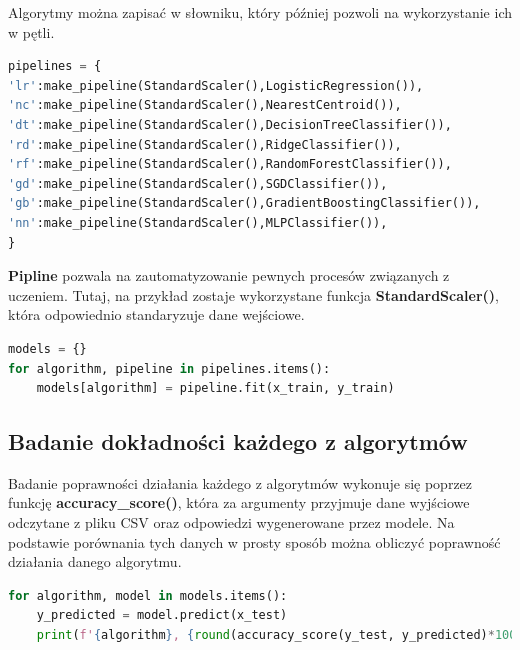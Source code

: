 \quad Algorytmy można zapisać w słowniku, który później pozwoli na wykorzystanie ich w pętli. 

\begin{lstlisting}[language=python, style=programming, captionpos=b, caption={Funkcja zwracająca rozpoznany gest}]
pipelines = {
'lr':make_pipeline(StandardScaler(),LogisticRegression()),
'nc':make_pipeline(StandardScaler(),NearestCentroid()),
'dt':make_pipeline(StandardScaler(),DecisionTreeClassifier()),
'rd':make_pipeline(StandardScaler(),RidgeClassifier()),
'rf':make_pipeline(StandardScaler(),RandomForestClassifier()),
'gd':make_pipeline(StandardScaler(),SGDClassifier()),
'gb':make_pipeline(StandardScaler(),GradientBoostingClassifier()),
'nn':make_pipeline(StandardScaler(),MLPClassifier()),
}
\end{lstlisting}

\quad \textbf{Pipline} pozwala na zautomatyzowanie pewnych procesów związanych z uczeniem. Tutaj, na przykład zostaje wykorzystane funkcja \textbf{StandardScaler()}, która odpowiednio standaryzuje dane wejściowe. 

\begin{lstlisting}[language=python, style=programming, captionpos=b, caption={Trenowanie modeli}]
models = {}
for algorithm, pipeline in pipelines.items():
    models[algorithm] = pipeline.fit(x_train, y_train)
\end{lstlisting}


\subsection{Badanie dokładności każdego z algorytmów}

\quad Badanie poprawności działania każdego z algorytmów wykonuje się poprzez funkcję \textbf{accuracy\_score()}, która za argumenty przyjmuje dane wyjściowe odczytane z pliku CSV oraz odpowiedzi wygenerowane przez modele. Na podstawie porównania tych danych w prosty sposób można obliczyć poprawność działania danego algorytmu.  \newline

\begin{lstlisting}[language=python, style=programming, captionpos=b, caption={Sprawdzenie poprawności}]
for algorithm, model in models.items():
    y_predicted = model.predict(x_test)
    print(f'{algorithm}, {round(accuracy_score(y_test, y_predicted)*100,2)}%')
\end{lstlisting}


